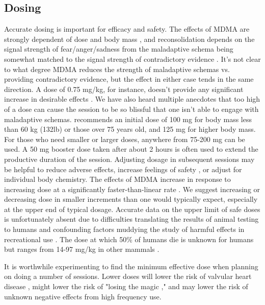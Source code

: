 \documentclass[12pt,letterpaper]{book}
\begin{document}
\subsection*{Dosing}
\label{sec:dosing}
Accurate dosing is important for efficacy and safety. The effects of MDMA are strongly dependent of dose and body mass \cite{studerusResponse}, and reconsolidation depends on the signal strength of fear/anger/sadness from the maladaptive schema being somewhat matched to the signal strength of contradictory evidence \cite{eckerUnlocking}. It's not clear to what degree MDMA reduces the strength of maladaptive schemas vs. providing contradictory evidence, but the effect in either case tends in the same direction. A dose of 0.75 mg/kg, for instance, doesn't provide any significant increase in desirable effects \cite{bediMDMALowDose}. We have also heard multiple anecdotes that too high of a dose can cause the session to be so blissful that one isn't able to engage with maladaptive schemas. \textcite{liechtiInteractions} recommends an initial dose of 100 mg for body mass less than 60 kg (132lb) or those over 75 years old, and 125 mg for higher body mass. For those who need smaller or larger doses, anywhere from 75-200 mg can be used. A 50 mg booster dose taken after about 2 hours is often used to extend the productive duration of the session. Adjusting dosage in subsequent sessions may be helpful to reduce adverse effects, increase feelings of safety \cite{regan2021Connection}, or adjust for individual body chemistry. The effects of MDMA increase in response to increasing dose at a significantly faster-than-linear rate \cite{de2000nonlinear}. We suggest increasing or decreasing dose in smaller increments than one would typically expect, especially at the upper end of typical dosage. Accurate data on the upper limit of safe doses is unfortunately absent due to difficulties translating the results of animal testing to humans and confounding factors muddying the study of harmful effects in recreational use \cite{passieHistory}. The dose at which 50\% of humans die is unknown for humans but ranges from 14-97 mg/kg in other mammals \cite{pharmalaInvestigatorBrochure}.

It is worthwhile experimenting to find the minimum effective dose when planning on doing a number of sessions. Lower doses will lower the risk of valvular heart disease \cite{droogmans2007valvular,tagen2023valvular}, might lower the risk of "losing the magic \cite{farreTolerance,parrottTolerance}," and may lower the risk of unknown negative effects from high frequency use.
\end{document}
